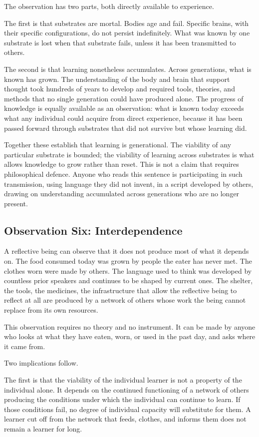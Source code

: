 \documentclass[11pt]{article}
\begin{document}
The observation has two parts, both directly available to
experience.

The first is that substrates are mortal. Bodies age and fail.
Specific brains, with their specific configurations, do not persist
indefinitely. What was known by one substrate is lost when that
substrate fails, unless it has been transmitted to others.

The second is that learning nonetheless accumulates. Across
generations, what is known has grown. The understanding of the body
and brain that support thought took hundreds of years to develop and
required tools, theories, and methods that no single generation
could have produced alone. The progress of knowledge is equally
available as an observation: what is known today exceeds what any
individual could acquire from direct experience, because it has
been passed forward through substrates that did not survive but
whose learning did.

Together these establish that learning is generational. The
viability of any particular substrate is bounded; the viability of
learning across substrates is what allows knowledge to grow rather
than reset. This is not a claim that requires philosophical
defence. Anyone who reads this sentence is participating in such
transmission, using language they did not invent, in a script
developed by others, drawing on understanding accumulated across
generations who are no longer present.

\subsection{Observation Six: Interdependence}

A reflective being can observe that it does not produce most of
what it depends on. The food consumed today was grown by people
the eater has never met. The clothes worn were made by others. The
language used to think was developed by countless prior speakers
and continues to be shaped by current ones. The shelter, the tools,
the medicines, the infrastructure that allow the reflective being
to reflect at all are produced by a network of others whose work
the being cannot replace from its own resources.

This observation requires no theory and no instrument. It can be
made by anyone who looks at what they have eaten, worn, or used in
the past day, and asks where it came from.

Two implications follow.

The first is that the viability of the individual learner is not a
property of the individual alone. It depends on the continued
functioning of a network of others producing the conditions under
which the individual can continue to learn. If those conditions
fail, no degree of individual capacity will substitute for them. A
learner cut off from the network that feeds, clothes, and informs
them does not remain a learner for long.
\end{document}
